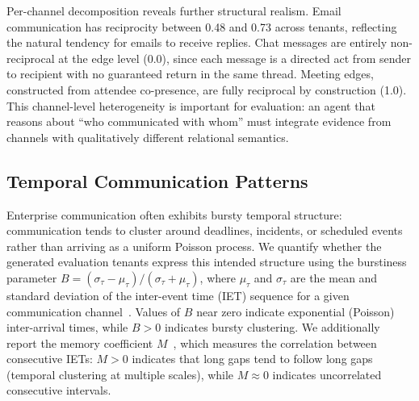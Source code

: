 Per-channel decomposition reveals further structural realism. Email communication has reciprocity between 0.48 and 0.73 across tenants, reflecting the natural tendency for emails to receive replies. Chat messages are entirely non-reciprocal at the edge level (0.0), since each message is a directed act from sender to recipient with no guaranteed return in the same thread. Meeting edges, constructed from attendee co-presence, are fully reciprocal by construction (1.0). This channel-level heterogeneity is important for evaluation: an agent that reasons about ``who communicated with whom'' must integrate evidence from channels with qualitatively different relational semantics.

\subsection{Temporal Communication Patterns}
\label{sec:temporal-stats}

Enterprise communication often exhibits bursty temporal structure: communication tends to cluster around deadlines, incidents, or scheduled events rather than arriving as a uniform Poisson process. We quantify whether the generated evaluation tenants express this intended structure using the burstiness parameter $B = (\sigma_\tau - \mu_\tau) / (\sigma_\tau + \mu_\tau)$, where $\mu_\tau$ and $\sigma_\tau$ are the mean and standard deviation of the inter-event time (IET) sequence for a given communication channel~\cite{goh2008burstiness}. Values of $B$ near zero indicate exponential (Poisson) inter-arrival times, while $B > 0$ indicates bursty clustering. We additionally report the memory coefficient $M$~\cite{goh2008burstiness}, which measures the correlation between consecutive IETs: $M > 0$ indicates that long gaps tend to follow long gaps (temporal clustering at multiple scales), while $M \approx 0$ indicates uncorrelated consecutive intervals.

